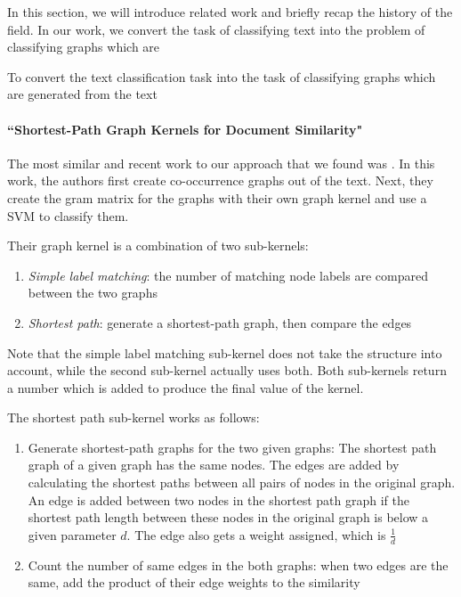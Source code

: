 

In this section, we will introduce related work and briefly recap the history of the field.
In our work, we convert the task of classifying text into the problem of classifying graphs which are 

To convert the text classification task into the task of classifying graphs which are generated from the text


\paragraph{``Shortest-Path Graph Kernels for Document Similarity" \cite{Nikolentzos2017a}}
The most similar and recent work to our approach that we found was \cite{Nikolentzos2017a}. In this work, the authors first create co-occurrence graphs out of the text. Next, they create the gram matrix for the graphs with their own graph kernel and use a SVM to classify them.

Their graph kernel is a combination of two sub-kernels:
\begin{enumerate}
    \item{\textit{Simple label matching}: the number of matching node labels are compared between the two graphs}
    \item{\textit{Shortest path}: generate a shortest-path graph, then compare the edges}
\end{enumerate}
Note that the simple label matching sub-kernel does not take the structure into account, while the second sub-kernel actually uses both.
Both sub-kernels return a number which is added to produce the final value of the kernel.

The shortest path sub-kernel works as follows:
\begin{enumerate}
    \item{Generate shortest-path graphs for the two given graphs: The shortest path graph of a given graph has the same nodes.
    The edges are added by calculating the shortest paths between all pairs of nodes in the original graph. An edge is added between two nodes in the shortest path graph if the shortest path length between these nodes in the original graph is below a given parameter $d$. The edge also gets a weight assigned, which is $\frac{1}{d}$}
    \item{Count the number of same edges in the both graphs: when two edges are the same, add the product of their edge weights to the similarity}
\end{enumerate}

